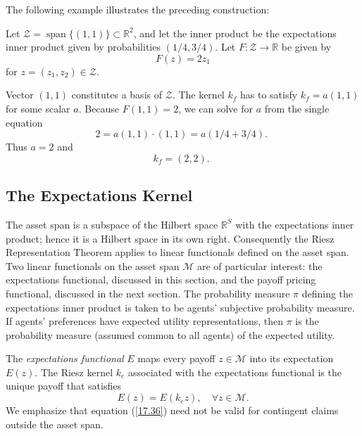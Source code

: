 \documentclass[\topdir/lecture\_notes.tex]{subfiles}
\begin{document}
\begin{optional}
The following example illustrates the preceding construction:
\begin{example}\label{ex:riesz_kernel_construction}
Let \(\mathcal{Z}=\operatorname{span}\{(1,1)\} \subset \mathbb{R}^{2}\), and let the inner product be the expectations inner product given by probabilities $(1 / 4,3 / 4)$. Let \(F: \mathcal{Z} \rightarrow \mathbb{R}\) be given by
\begin{equation*}
F(z)=2 z_{1} 
\end{equation*}
for \(z=\left(z_{1}, z_{2}\right) \in \mathcal{Z}\).

Vector $(1,1)$ constitutes a basis of \(\mathcal{Z}\). The kernel \(k_{f}\) has to satisfy \(k_{f}=a(1,1)\) for some scalar \(a\). Because \(F(1,1)=2\), we can solve for \(a\) from the single equation
\begin{equation*}
2=a(1,1) \cdot(1,1)=a(1 / 4+3 / 4) \text {. } 
\end{equation*}
Thus \(a=2\) and
\begin{equation*}
k_{f}=(2,2) \text {. } 
\end{equation*}
\end{example}
\end{optional}

\subsection{The Expectations Kernel}
The asset span is a subspace of the Hilbert space \(\mathbb{R}^{S}\) with the expectations inner product; hence it is a Hilbert space in its own right. Consequently the Riesz Representation Theorem applies to linear functionals defined on the asset span. Two linear functionals on the asset span \(\mathcal{M}\) are of particular interest: the expectations functional, discussed in this section, and the payoff pricing functional, discussed in the next section. The probability measure \(\pi\) defining the expectations inner product is taken to be agents' subjective probability measure. If agents' preferences have expected utility representations, then \(\pi\) is the probability measure (assumed common to all agents) of the expected utility.

The \emph{expectations functional} \(E\) maps every payoff \(z \in \mathcal{M}\) into its expectation \(E(z)\). The Riesz kernel \(k_{e}\) associated with the expectations functional is the unique payoff that satisfies
\begin{equation}
E(z)=E\left(k_{e} z\right), \quad \forall z \in \mathcal{M}. \label{17.36}
\end{equation}
We emphasize that equation (\ref{17.36}) need not be valid for contingent claims outside the asset span.
\end{document}
